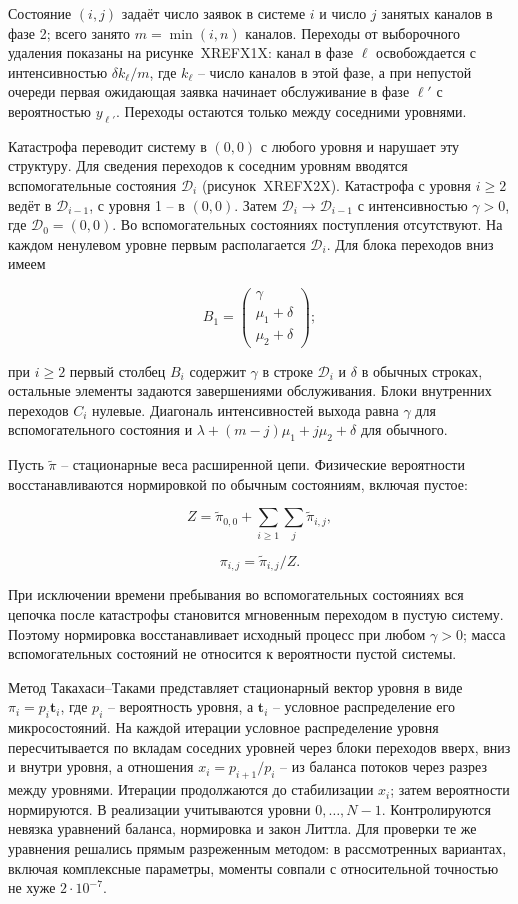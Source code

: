 Состояние \((i,j)\) задаёт число заявок в системе \(i\) и число \(j\) занятых каналов в фазе 2; всего занято \(m=\min(i,n)\) каналов. Переходы от выборочного удаления показаны на рисунке~XREFX1X: канал в фазе \(\ell\) освобождается с интенсивностью \(\delta k_\ell/m\), где \(k_\ell\) -- число каналов в этой фазе, а при непустой очереди первая ожидающая заявка начинает обслуживание в фазе \(\ell'\) с вероятностью \(y_{\ell'}\). Переходы остаются только между соседними уровнями.

Катастрофа переводит систему в \((0,0)\) с любого уровня и нарушает эту структуру. Для сведения переходов к соседним уровням вводятся вспомогательные состояния \(\mathcal D_i\) (рисунок~XREFX2X). Катастрофа с уровня \(i\ge2\) ведёт в \(\mathcal D_{i-1}\), с уровня 1 -- в \((0,0)\). Затем \(\mathcal D_i\to\mathcal D_{i-1}\) с интенсивностью \(\gamma>0\), где \(\mathcal D_0=(0,0)\). Во вспомогательных состояниях поступления отсутствуют. На каждом ненулевом уровне первым располагается \(\mathcal D_i\). Для блока переходов вниз имеем


\[B_1=\begin{pmatrix}\gamma\\\mu_1+\delta\\\mu_2+\delta\end{pmatrix};\]


при \(i\ge2\) первый столбец \(B_i\) содержит \(\gamma\) в строке \(\mathcal D_i\) и \(\delta\) в обычных строках, остальные элементы задаются завершениями обслуживания. Блоки внутренних переходов \(C_i\) нулевые. Диагональ интенсивностей выхода равна \(\gamma\) для вспомогательного состояния и \(\lambda+(m-j)\mu_1+j\mu_2+\delta\) для обычного.

Пусть \(\widetilde\pi\) -- стационарные веса расширенной цепи. Физические вероятности восстанавливаются нормировкой по обычным состояниям, включая пустое:


\[Z=\widetilde\pi_{0,0}+\sum_{i\ge1}\sum_j\widetilde\pi_{i,j},\]

\[\pi_{i,j}=\widetilde\pi_{i,j}/Z.\]


При исключении времени пребывания во вспомогательных состояниях вся цепочка после катастрофы становится мгновенным переходом в пустую систему. Поэтому нормировка восстанавливает исходный процесс при любом \(\gamma>0\); масса вспомогательных состояний не относится к вероятности пустой системы.

Метод Такахаси--Таками представляет стационарный вектор уровня в виде \(\pi_i=p_i\boldsymbol t_i\), где \(p_i\) -- вероятность уровня, а \(\boldsymbol t_i\) -- условное распределение его микросостояний. На каждой итерации условное распределение уровня пересчитывается по вкладам соседних уровней через блоки переходов вверх, вниз и внутри уровня, а отношения \(x_i=p_{i+1}/p_i\) -- из баланса потоков через разрез между уровнями. Итерации продолжаются до стабилизации \(x_i\); затем вероятности нормируются. В реализации учитываются уровни \(0,\ldots,N-1\). Контролируются невязка уравнений баланса, нормировка и закон Литтла. Для проверки те же уравнения решались прямым разреженным методом: в рассмотренных вариантах, включая комплексные параметры, моменты совпали с относительной точностью не хуже \(2\cdot10^{-7}\).

